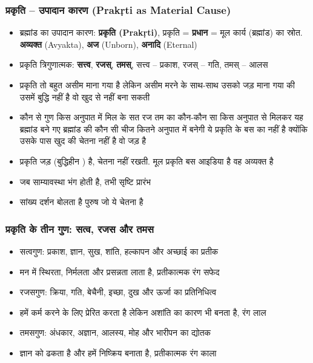 \begin{frame}[fragile]\frametitle{प्रकृति – उपादान कारण (Prakṛti as Material Cause)}

      \begin{itemize}
        \item ब्रह्मांड का उपादान कारण: \textbf{प्रकृति (Prakṛti)},         प्रकृति = \textbf{प्रधान} = मूल कार्य (ब्रह्मांड) का स्रोत. \textbf{अव्यक्त} (Avyakta), \textbf{अज} (Unborn), \textbf{अनादि} (Eternal)
        \item प्रकृति त्रिगुणात्मक: \textbf{सत्त्व}, \textbf{रजस्}, \textbf{तमस्}, सत्त्व – प्रकाश, रजस् – गति, तमस् – आलस 
		\item प्रकृति तो बहुत असीम माना गया है लेकिन असीम मरने के साथ-साथ उसको जड़ माना गया की उसमें बुद्धि नहीं है वो खुद से नहीं बना सकती 
		\item कौन से गुण किस अनुपात में मिल के सत रज  तम का कौन-कौन सा किस अनुपात से मिलकर यह ब्रह्मांड बने गए
ब्रह्मांड की कौन सी चीज कितने अनुपात में बनेगी ये प्रकृति के बस का नहीं है क्योंकि उसके पास खुद की चेतना नहीं है वो जड़ है 
        \item प्रकृति जड़ (बुद्धिहीन ) है, चेतना नहीं रखती. मूल प्रकृति बस आइडिया है वह अव्यक्त है 
        \item जब साम्यावस्था भंग होती है, तभी सृष्टि प्रारंभ
		\item सांख्य दर्शन बोलता है पुरुष जो ये चेतना है  
	
      \end{itemize}

\end{frame}

\begin{frame}[fragile]\frametitle{प्रकृति के तीन गुण: सत्व, रजस और तमस}
      \begin{itemize}
	\item सत्वगुण: प्रकाश, ज्ञान, सुख, शांति, हल्कापन और अच्छाई का प्रतीक
	\item मन में स्थिरता, निर्मलता और प्रसन्नता लाता है, प्रतीकात्मक रंग सफेद
	\item रजसगुण: क्रिया, गति, बेचैनी, इच्छा, दुख और ऊर्जा का प्रतिनिधित्व
	\item हमें कर्म करने के लिए प्रेरित करता है लेकिन अशांति का कारण भी बनता है, रंग लाल
	\item तमसगुण: अंधकार, अज्ञान, आलस्य, मोह और भारीपन का द्योतक
	\item ज्ञान को ढकता है और हमें निष्क्रिय बनाता है, प्रतीकात्मक रंग काला
	  \end{itemize}
\end{frame}

